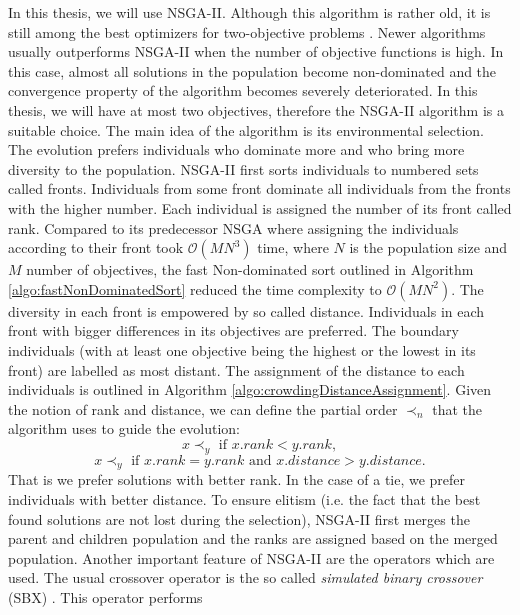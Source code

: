 In this thesis, we will use NSGA-II. Although
this algorithm is rather old, it is still among the best optimizers for
two-objective problems \cite{IshibuchiReviewMOEA}. Newer algorithms usually outperforms NSGA-II when the number of objective functions is high. In this case, almost all solutions in the population become non-dominated and the convergence property of the algorithm becomes severely deteriorated. In this thesis, we will have at most two objectives, therefore the NSGA-II algorithm is a suitable choice. 
The main idea of the algorithm is its environmental selection. The evolution prefers individuals who dominate more and who bring more diversity to the population. NSGA-II first sorts individuals to numbered sets called fronts. Individuals from some front dominate all individuals from the fronts with the higher number. Each individual is assigned the number of its front called rank. Compared to its predecessor NSGA where assigning the individuals according to their front took $\mathcal{O}(MN^3)$ time, where $N$ is the population size and $M$ number of objectives, the fast Non-dominated sort outlined in Algorithm \ref{algo:fastNonDominatedSort} reduced the time complexity to $\mathcal{O}(MN^2)$.
The diversity in each front is empowered by so called distance. Individuals in each front with bigger differences in its objectives are preferred. The boundary individuals (with at least one objective being the highest or the lowest in its front) are labelled as most distant. The assignment of the distance to each individuals is outlined in Algorithm \ref{algo:crowdingDistanceAssignment}. 
Given the notion of rank and distance, we can define the partial order $\prec_n$ that the algorithm uses to guide the evolution:
\begin{equation*}
x \prec_y \text{ if } x.rank < y.rank,
\end{equation*}
\begin{equation*}
x \prec_y \text{ if } x.rank = y.rank \text{ and } x.distance > y.distance.
\end{equation*}
That is we prefer solutions with better rank. In the case of a tie, we prefer individuals with better distance.
To ensure elitism (i.e. the fact that the best found solutions are not
lost during the selection), NSGA-II first merges the parent and children
population and the ranks are assigned based on the merged population.
Another important feature of NSGA-II are the operators which are
used. The usual crossover operator is the so called \emph{simulated binary crossover} (SBX) \cite{DebAgravalSimulatedBinaryCrossover}. This operator performs
